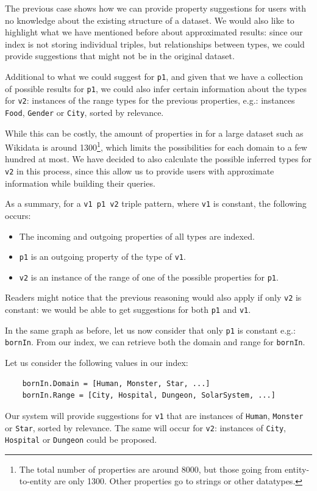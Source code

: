 The previous case shows how we can provide property suggestions for users with no knowledge about the existing structure of a dataset. We would also like to highlight what we have mentioned before about approximated results: since our index is not storing individual triples, but relationships between types, we could provide suggestions that might not be in the original dataset.

Additional to what we could suggest for \texttt{p1}, and given that we have a collection of possible results for \texttt{p1}, we could also infer certain information about the types for \texttt{v2}: instances of the range types for the previous properties, e.g.: instances \texttt{Food}, \texttt{Gender} or \texttt{City}, sorted by relevance.

While this can be costly, the amount of properties in for a large dataset such as Wikidata is around 1300\footnote{The total number of properties are around 8000, but those going from entity-to-entity are only 1300. Other properties go to strings or other datatypes.}, which limits the possibilities for each domain to a few hundred at most. We have decided to also calculate the possible inferred types for \texttt{v2} in this process, since this allow us to provide users with approximate information while building their queries. 

As a summary, for a \texttt{v1 p1 v2} triple pattern, where \texttt{v1} is constant, the following occurs:
\begin{itemize}
    \item The incoming and outgoing properties of all types are indexed.
    \item \texttt{p1} is an outgoing property of the type of \texttt{v1}.
    \item \texttt{v2} is an instance of the range of one of the possible properties for \texttt{p1}.
\end{itemize}

Readers might notice that the previous reasoning would also apply if only \texttt{v2} is constant: we would be able to get suggestions for both \texttt{p1} and \texttt{v1}.

\begin{example}
In the same graph as before, let us now consider that only \texttt{p1} is constant e.g.: \texttt{bornIn}. From our index, we can retrieve both the domain and range for \texttt{bornIn}. 

Let us consider the following values in our index:
\begin{verbatim}
    bornIn.Domain = [Human, Monster, Star, ...]
    bornIn.Range = [City, Hospital, Dungeon, SolarSystem, ...]
\end{verbatim}

Our system will provide suggestions for \texttt{v1} that are instances of \texttt{Human}, \texttt{Monster} or \texttt{Star}, sorted by relevance. The same will occur for \texttt{v2}: instances of \texttt{City}, \texttt{Hospital} or \texttt{Dungeon} could be proposed.

\end{example}

